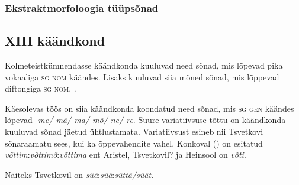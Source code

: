 \documentclass[12pt,a4paper]{article}
\newcommand{\vadja}[1]{\textit{#1}}
\newcommand{\msd}[1]{\textsc{#1}}
\begin{document}

\subsubsection*{Ekstraktmorfoloogia tüüpsõnad}
\vspace{-3.5em}








\subsection{\RN{13} käändkond}

Kolmeteistkümnendasse käändkonda kuuluvad need sõnad, mis lõpevad pika vokaaliga \msd{sg nom} käändes. Lisaks kuuluvad siia mõned sõnad, mis lõppevad diftongiga \msd{sg nom}. \cite[49]{ariste_grammar_1968}.

Käesolevas töös on siia käändkonda koondatud need sõnad, mis \msd{sg gen} käändes lõpevad \textit{-me/-mä/-ma/-mõ/-ne/-re}. Suure variatiivsuse tõttu on käändkonda kuuluvad sõnad jäetud ühtlustamata. Variatiivsust esineb nii Tsvetkovi sõnaraamatu sees, kui ka õppevahendite vahel. %
Konkoval (\citeyear{konkova_vaddceeli_2014}) on esitatud \textit{võttim}:\textit{võttimõ}:\textit{võttima} ent Aristel, Tsvetkovil? ja Heinsool on \textit{võti}.

Näiteks Tsvetkovil on \textit{süä}:\textit{süä}:\textit{süttä/süät}.

\end{document}
